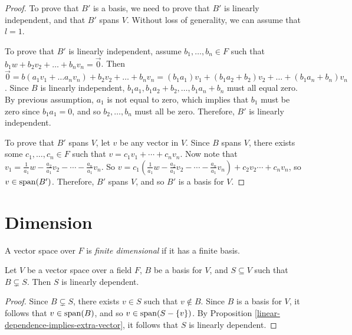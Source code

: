 \begin{proof}
    To prove that $B'$ is a basis, we need to prove that $B'$ is linearly independent, and that $B'$ spans $V$. Without loss of generality, we can assume that $l = 1$.

    To prove that $B'$ is linearly independent, assume $b_1, \ldots, b_n \in F$ such that $b_1w + b_2v_2 + \ldots + b_nv_n = \vec{0}$. Then $\vec{0} = b(a_1v_1 + \ldots a_nv_n) + b_2v_2 + \ldots + b_nv_n = (b_1a_1)v_1 + (b_1a_2 + b_2)v_2 + \ldots + (b_1a_n + b_n)v_n$. Since $B$ is linearly independent, $b_1a_1, b_1a_2 + b_2, \ldots, b_1a_n + b_n$ must all equal zero. By previous assumption, $a_1$ is not equal to zero, which implies that $b_1$ must be zero since $b_1a_1 = 0$, and so $b_2, \ldots, b_n$ must all be zero. Therefore, $B'$ is linearly independent.

    To prove that $B'$ spans $V$, let $v$ be any vector in $V$. Since $B$ spans $V$, there exists some $c_1, \ldots, c_n \in F$ such that $v = c_1v_1 + \cdots + c_nv_n$. Now note that $v_1 = \frac{1}{a_1}w - \frac{a_2}{a_1}v_2 - \cdots - \frac{a_n}{a_1}v_n$. So $v = c_1\left(\frac{1}{a_1}w - \frac{a_2}{a_1}v_2 - \cdots - \frac{a_n}{a_1}v_n\right) + c_2v_2 \cdots + c_nv_n$, so $v \in \operatorname{span}(B')$. Therefore, $B'$ spans $V$, and so $B'$ is a basis for $V$.
\end{proof}

\section{Dimension}

\begin{defn}\label{finite-dimensional-defn}
    A vector space over $F$ is \emph{finite dimensional} if it has a finite basis.
\end{defn}

\begin{lemma}\label{basis-maximal-independent-subset}
    Let $V$ be a vector space over a field $F$, $B$ be a basis for $V$, and $S \subseteq V$ such that $B \subsetneq S$. Then $S$ is linearly dependent.
\end{lemma}

\begin{proof}
    Since $B \subsetneq S$, there exists $v \in S$ such that $v \notin B$. Since $B$ is a basis for $V$, it follows that $v \in \operatorname{span}(B)$, and so $v \in \operatorname{span}(S - \{v\})$. By Proposition \ref{linear-dependence-implies-extra-vector}, it follows that $S$ is linearly dependent.
\end{proof}


